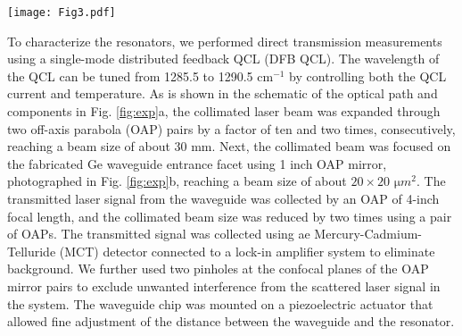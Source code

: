 \documentclass[fleqn,10pt,twocolumn]{wlscirep}
\begin{document}
\begin{figure*}[ht!]
    \centering\texttt{[image: Fig3.pdf]}
    \caption{\label{fig:exp}\textbf{Experimental setup for transmission measurements.}  Schematic of the optical path and components. A DFB QCL is focused into the waveguide and coupled to the resonator.  Photograph of the coupling setup.  Optical image of the Ge WGM and waveguide when coupled, taken from the objective above the coupling area shown in \ref{fig:exp}b.}
\end{figure*}
To characterize the resonators, we performed direct transmission measurements using a single-mode distributed feedback QCL (DFB QCL).
The wavelength of the QCL can be tuned from 1285.5 to 1290.5 $\si{\cm^{-1}}$ by controlling both the QCL current and temperature. As is shown in the schematic of the optical path and components in Fig. \ref{fig:exp}a, the collimated laser beam was expanded through two off-axis parabola (OAP) pairs by a factor of ten and two times, consecutively, reaching a beam size of about 30 mm. Next, the collimated beam was focused on the fabricated Ge waveguide entrance facet using 1 inch OAP mirror, photographed in Fig. \ref{fig:exp}b, reaching a beam size of about $20\times20\,\, \si{\micro m^{2}}$. The transmitted laser signal from the waveguide was collected by an OAP of 4-inch focal length, and the collimated beam size was reduced by two times using a pair of OAPs. The transmitted signal was collected using ae Mercury-Cadmium-Telluride (MCT) detector connected to a lock-in amplifier system to eliminate background. We further used two pinholes at the confocal planes of the OAP mirror pairs to exclude unwanted interference from the scattered laser signal in the system. The waveguide chip was mounted on a piezoelectric actuator that allowed fine adjustment of the distance between the waveguide and the resonator.
\end{document}
